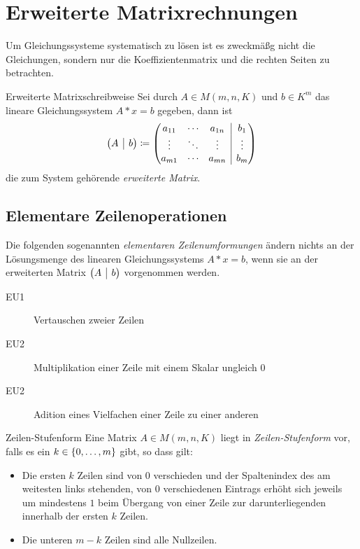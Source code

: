 \chapter{Erweiterte Matrixrechnungen}
Um Gleichungssysteme systematisch zu lösen ist es zweckmäßg nicht die Gleichungen, sondern nur die Koeffizientenmatrix und die rechten Seiten zu betrachten.

\begin{definition}{Erweiterte Matrixschreibweise}
	Sei durch $A\in M(m,n,K)$ und $b\in K^m$ das lineare Gleichungssystem $A*x=b$ gegeben, dann ist
	\begin{equation*}
		\ematrix{c|c}{A & b}\coloneqq\ematrix{c c c | c}{
			\ma{11} & \cdots & \ma{1n} & b_1\\
			\vdots & \ddots & \vdots & \vdots\\
			\ma{m1} & \cdots & \ma{mn} & b_m
		}
	\end{equation*}
	die zum System gehörende \emph{erweiterte Matrix}.
\end{definition}

\section{Elementare Zeilenoperationen}
Die folgenden sogenannten \emph{elementaren Zeilenumformungen} ändern nichts an der Lösungsmenge des linearen Gleichungssystems $A*x=b$, wenn sie an der erweiterten Matrix $\ematrix{c|c}{A & b}$ vorgenommen werden.

\begin{description}
	\item[EU1] Vertauschen zweier Zeilen
	\item[EU2] Multiplikation einer Zeile mit einem Skalar ungleich $0$
	\item[EU2] Adition eines Vielfachen einer Zeile zu einer anderen
\end{description}

\begin{definition}{Zeilen-Stufenform}
	Eine Matrix $A\in M(m,n,K)$ liegt in \emph{Zeilen-Stufenform} vor, falls es ein $k\in \left\{ 0,\ldots, m \right\}$ gibt, so dass gilt:
	\begin{itemize}
		\item Die ersten $k$ Zeilen sind von $0$ verschieden und der Spaltenindex des am weitesten links stehenden, von $0$ verschiedenen Eintrags erhöht sich jeweils um mindestens $1$ beim Übergang von einer Zeile zur darunterliegenden innerhalb der ersten $k$ Zeilen.
		\item Die unteren $m-k$ Zeilen sind alle Nullzeilen.
	\end{itemize}
\end{definition}


